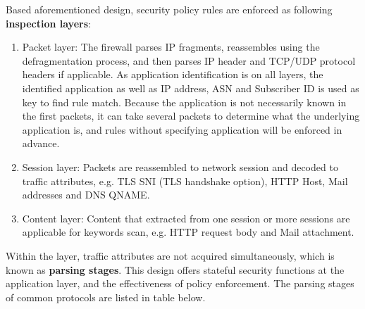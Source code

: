 Based aforementioned design, security policy rules are enforced as following \textbf{inspection layers}:
\begin{description}[leftmargin=0pt,itemindent=0em,itemsep=0.5ex]
    \item
    \begin{enumerate}
        \item 	Packet layer: The firewall parses IP fragments, reassembles using the defragmentation process, and then parses IP header and TCP/UDP protocol headers if applicable. As application identification is on all layers, the identified application as well as IP address, ASN and Subscriber ID is used as key to find rule match. Because the application is not necessarily known in the first packets, it can take several packets to determine what the underlying application is, and rules without specifying application will be enforced in advance.
        \item 	Session layer: Packets are reassembled to network session and decoded to traffic attributes, e.g. TLS SNI (TLS handshake option), HTTP Host, Mail addresses and DNS QNAME.
        \item 	Content layer: Content that extracted from one session or more sessions are applicable for keywords scan, e.g. HTTP request body and Mail attachment.
    \end{enumerate}
 \end{description}
Within the layer, traffic attributes are not acquired simultaneously, which is known as \textbf{parsing stages}. This design offers stateful security functions at the application layer, 
and the effectiveness of policy enforcement. The parsing stages of common protocols are listed in table below.\\
